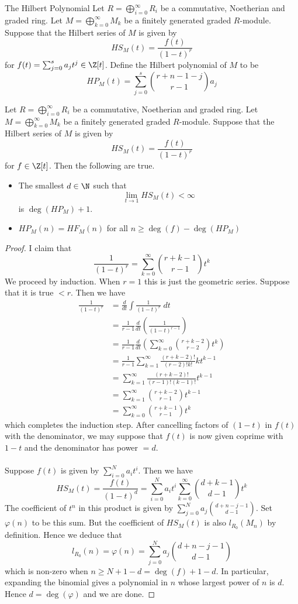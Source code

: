 \documentclass[a4paper]{article}
\begin{document}
\begin{defn}{The Hilbert Polynomial}{} Let $R=\bigoplus_{i=0}^\infty R_i$ be a commutative, Noetherian and graded ring. Let $M=\bigoplus_{k=0}^\infty M_k$ be a finitely generated graded $R$-module. Suppose that the Hilbert series of $M$ is given by $$HS_M(t)=\frac{f(t)}{(1-t)^r}$$ for $f(t)=\sum_{j=0}^sa_jt^j\in\Z[t]$. Define the Hilbert polynomial of $M$ to be $$HP_M(t)=\sum_{j=0}^s\binom{r+n-1-j}{r-1}a_j$$
\end{defn}

\begin{lmm}{}{} Let $R=\bigoplus_{i=0}^\infty R_i$ be a commutative, Noetherian and graded ring. Let $M=\bigoplus_{k=0}^\infty M_k$ be a finitely generated graded $R$-module. Suppose that the Hilbert series of $M$ is given by $$HS_M(t)=\frac{f(t)}{(1-t)^r}$$ for $f\in\Z[t]$. Then the following are true. 
\begin{itemize}
\item The smallest $d\in\N$ such that $$\lim_{t\to 1}HS_M(t)<\infty$$ is $\deg(HP_M)+1$. 
\item $HP_M(n)=HF_M(n)$ for all $n\geq\deg(f)-\deg(HP_M)$
\end{itemize} 
\begin{proof}
I claim that $$\frac{1}{(1-t)^r}=\sum_{k=0}^\infty\binom{r+k-1}{r-1}t^k$$ We proceed by induction. When $r=1$ this is just the geometric series. Suppose that it is true $<r$. Then we have 
\begin{align*}
\frac{1}{(1-t)^r}&=\frac{d}{dt}\int\frac{1}{(1-t)^r}\;dt\\
&=\frac{1}{r-1}\frac{d}{dt}\left(\frac{1}{(1-t)^{r-1}}\right)\\
&=\frac{1}{r-1}\frac{d}{dt}\left(\sum_{k=0}^\infty\binom{r+k-2}{r-2}t^k\right)\\
&=\frac{1}{r-1}\sum_{k=1}^\infty\frac{(r+k-2)!}{(r-2)!k!}kt^{k-1}\\
&=\sum_{k=1}^\infty\frac{(r+k-2)!}{(r-1)!(k-1)!}t^{k-1}\\
&=\sum_{k=1}^\infty\binom{r+k-2}{r-1}t^{k-1}\\
&=\sum_{k=0}^\infty\binom{r+k-1}{r-1}t^k
\end{align*}
which completes the induction step. After cancelling factors of $(1-t)$ in $f(t)$ with the denominator, we may suppose that $f(t)$ is now given coprime with $1-t$ and the denominator has power $=d$. \\~\\

Suppose $f(t)$ is given by $\sum_{i=0}^Na_it^i$. Then we have $$HS_M(t)=\frac{f(t)}{(1-t)^d}=\sum_{i=0}^Na_it^i\sum_{k=0}^\infty\binom{d+k-1}{d-1}t^k$$ The coefficient of $t^n$ in this product is given by $\sum_{j=0}^Na_j\binom{d+n-j-1}{d-1}$. Set $\varphi(n)$ to be this sum. But the coefficient of $HS_M(t)$ is also $l_{R_0}(M_n)$ by definition. Hence we deduce that $$l_{R_0}(n)=\varphi(n)=\sum_{j=0}^Na_j\binom{d+n-j-1}{d-1}$$ which is non-zero when $n\geq N+1-d=\deg(f)+1-d$. In particular, expanding the binomial gives a polynomial in $n$ whose largest power of $n$ is $d$. Hence $d=\deg(\varphi)$ and we are done. 
\end{proof}
\end{lmm}
\end{document}
